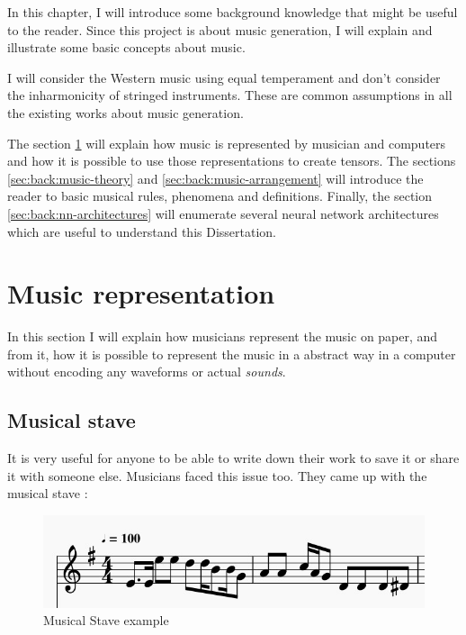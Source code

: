\documentclass[12pt]{report}
\begin{document}
In this chapter, I will introduce some background knowledge that might be useful to the reader. Since this project is about music generation, I will explain and illustrate some basic concepts about music.

I will consider the Western music using equal temperament and don't consider the inharmonicity of stringed instruments. These are common assumptions in all the existing works about music generation.

The section \ref{sec:back:musical-representation} will explain how music is represented by musician and computers and how it is possible to use those representations to create tensors.
The sections \ref{sec:back:music-theory} and \ref{sec:back:music-arrangement} will introduce the reader to basic musical rules, phenomena and definitions.
Finally, the section \ref{sec:back:nn-architectures} will enumerate several neural network architectures which are useful to understand this Dissertation.


\section{Music representation}
\label{sec:back:musical-representation}

In this section I will explain how musicians represent the music on paper, and from it, how it is possible to represent the music in a abstract way in a computer without encoding any waveforms or actual \textit{sounds}.

\subsection{Musical stave}

It is very useful for anyone to be able to write down their work to save it or share it with someone else. Musicians faced this issue too. They came up with the musical stave :

\begin{figure}[H]
    \centering
    \includegraphics[scale=0.75]{images/music/stave/musical_stave_example.jpg}
    \caption{Musical Stave example}
    \label{fig:musical_stave_example}
\end{figure}
\end{document}
